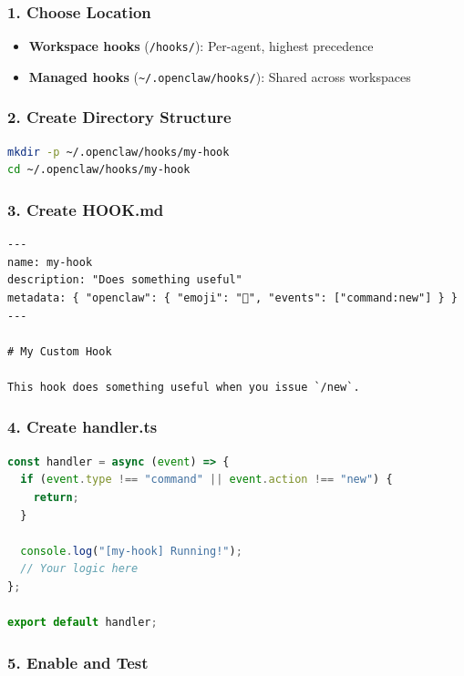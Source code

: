 \subsubsection{1. Choose Location}


\begin{itemize}
  \item \textbf{Workspace hooks} (\texttt{/hooks/}): Per-agent, highest precedence
  \item \textbf{Managed hooks} (\texttt{\textasciitilde{}/.openclaw/hooks/}): Shared across workspaces
\end{itemize}


\subsubsection{2. Create Directory Structure}


\begin{lstlisting}[language=bash]
mkdir -p ~/.openclaw/hooks/my-hook
cd ~/.openclaw/hooks/my-hook
\end{lstlisting}


\subsubsection{3. Create HOOK.md}


\begin{lstlisting}
---
name: my-hook
description: "Does something useful"
metadata: { "openclaw": { "emoji": "🎯", "events": ["command:new"] } }
---

# My Custom Hook

This hook does something useful when you issue `/new`.
\end{lstlisting}


\subsubsection{4. Create handler.ts}


\begin{lstlisting}[language=typescript]
const handler = async (event) => {
  if (event.type !== "command" || event.action !== "new") {
    return;
  }

  console.log("[my-hook] Running!");
  // Your logic here
};

export default handler;
\end{lstlisting}


\subsubsection{5. Enable and Test}


